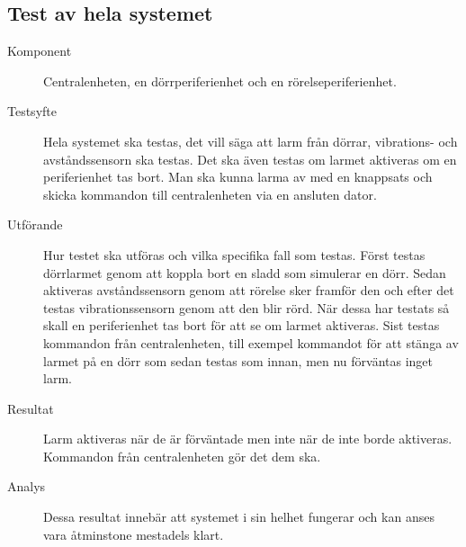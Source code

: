 \documentclass[a4paper]{article}
\begin{document}
\subsection{Test av hela systemet}
\begin{description}
\item[Komponent] Centralenheten, en dörrperiferienhet och en rörelseperiferienhet.

\item[Testsyfte] Hela systemet ska testas, det vill säga att larm från dörrar, vibrations- och avståndssensorn ska testas.
Det ska även testas om larmet aktiveras om en periferienhet tas bort.
Man ska kunna larma av med en knappsats och skicka kommandon till centralenheten via en ansluten dator.

\item[Utförande] Hur testet ska utföras och vilka specifika fall som testas.
Först testas dörrlarmet genom att koppla bort en sladd som simulerar en dörr.
Sedan aktiveras avståndssensorn genom att rörelse sker framför den och efter det testas vibrationssensorn genom att den blir rörd.
När dessa har testats så skall en periferienhet tas bort för att se om larmet aktiveras.
Sist testas kommandon från centralenheten, till exempel kommandot för att stänga av larmet på en dörr som sedan testas som innan, men nu förväntas inget larm.

\item[Resultat] Larm aktiveras när de är förväntade men inte när de inte borde aktiveras.
Kommandon från centralenheten gör det dem ska.

\item[Analys] Dessa resultat innebär att systemet i sin helhet fungerar och kan anses vara åtminstone mestadels klart.
\end{description}
\end{document}
